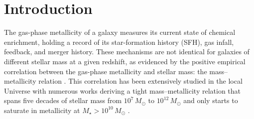 \documentclass[twocolumn]{aastex631}
\begin{document}

\section{Introduction} \label{sec:intro}

The gas-phase metallicity of a galaxy measures its current state of chemical enrichment, holding a record of its star-formation history (SFH), gas infall, feedback, and merger history. 
These mechanisms are not identical for galaxies of different stellar mass at a given redshift, as evidenced by the positive empirical correlation between the gas-phase metallicity and stellar mass: the mass--metallicity relation \citep{1968JRASC..62..145V, 1970A&A.....7..311P, 1979A&A....80..155L}.
This correlation has been extensively studied in the local Universe with numerous works deriving a tight mass--metallicity relation that spans five decades of stellar mass from $10^7\, M_{\odot}$ to $10^{12}\, M_{\odot}$ and only starts to saturate in metallicity at $M_{\star} > 10^{10}\, M_{\odot}$ \citep{2004ApJ...613..898T, 2006ApJ...647..970L, 2006ApJ...636..214V, 2008ApJ...681.1183K, 2010MNRAS.408.2115M, 2012ApJ...754...98B, 2013A&A...549A..25P, 2013MNRAS.432.1217P, 2013ApJ...765..140A, 2013ApJ...765...66H, 2015ApJ...800..121H, 2015MNRAS.446.1449L, 2016ApJ...828...67L, 2019ApJ...877....6B, maiolino+2019, curti+2020b, sanders+2021}. 
\end{document}
